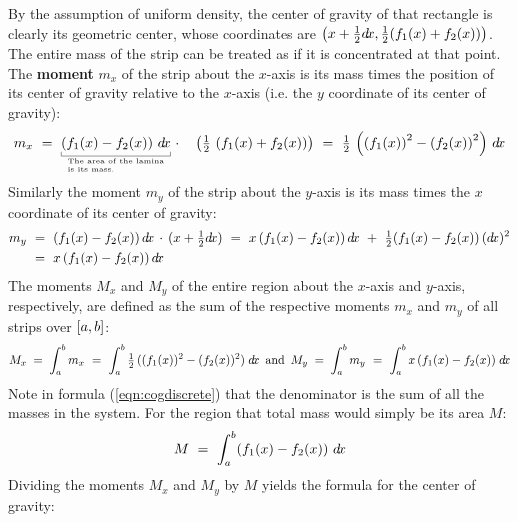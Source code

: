 By the assumption of uniform density, the center of gravity of that rectangle is
clearly its geometric center, whose coordinates are
$\left(x+\frac{1}{2}d\!x,\frac{1}{2}(f_1(x)+f_2(x))\right)$. The entire mass of
the strip can be treated as if it is concentrated at that point. The
\textbf{moment} $m_x$ of the strip about the $x$-axis is its mass times the
position of its center of gravity relative to the $x$-axis (i.e. the $y$
coordinate of its center of gravity):
\[
m_x ~=~ \underbracket[0.3pt]{\left(f_1(x)-f_2(x)\right)\,\dx}
_{\begin{minipage}[c]{0.2\linewidth}
    \tiny
    The area of the lamina is its mass.
\end{minipage}}
\,\cdot\quad\left(\tfrac{1}{2}\,\left(f_1(x)+f_2(x)\right)\right) ~=~
\tfrac{1}{2}\,\left(\left(f_1(x)\right)^2 - \left(f_2(x)\right)^2\right)\,\dx
\]
Similarly the moment $m_y$ of the strip about the $y$-axis is its mass times the
$x$ coordinate of its center of gravity:
\begin{align*}
m_y ~&=~ (f_1(x)-f_2(x))\,d\!x\,\cdot\,(x+\tfrac{1}{2}d\!x) ~=~
        x\,(f_1(x)-f_2(x))\,d\!x ~+~ \tfrac{1}{2} (f_1(x)-f_2(x))\,(d\!x)^2\\
~&=~ x\,(f_1(x)-f_2(x))\,d\!x
\end{align*}
The moments $M_x$ and $M_y$ of the entire region about the $x$-axis and
$y$-axis, respectively, are defined as the sum of the respective moments
$m_x$ and $m_y$ of all strips over $\lbrack a,b \rbrack$:
\[
M_x \;=\; \int_a^b m_x ~=~ \int_a^b \tfrac{1}{2}\,((f_1(x))^2 - (f_2(x))^2)\;d\!x
\enskip\text{and}\enskip
M_y \;=\; \int_a^b m_y ~=~ \int_a^b x\,(f_1(x)-f_2(x))\;d\!x
\]
Note in formula (\ref{eqn:cogdiscrete}) that the denominator is the sum of all
the masses in the system. For the region that total mass would simply be its
area $M$:
\[
M ~=~ \int_a^b (f_1(x)-f_2(x))~d\!x
\]
Dividing the moments $M_x$ and $M_y$ by $M$ yields the formula for the center of
gravity:
\newpage
{}

